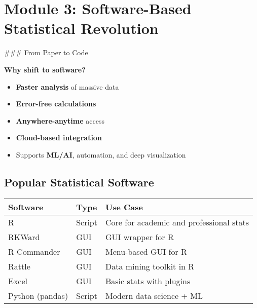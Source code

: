 \documentclass[
  letterpaper,
  DIV=11,
  numbers=noendperiod]{scrreprt}
\providecommand{\tightlist}{%
  \setlength{\itemsep}{0pt}\setlength{\parskip}{0pt}}
\begin{document}
\section{Module 3: Software-Based Statistical
Revolution}\label{module-3-software-based-statistical-revolution}

\#\#\# From Paper to Code

\textbf{Why shift to software?}

\begin{itemize}
\tightlist
\item
  \textbf{Faster analysis} of massive data
\item
  \textbf{Error-free calculations}
\item
  \textbf{Anywhere-anytime} access
\item
  \textbf{Cloud-based integration}
\item
  Supports \textbf{ML/AI}, automation, and deep visualization
\end{itemize}

\subsection{Popular Statistical
Software}\label{popular-statistical-software}

\begin{longtable}[]{@{}
  >{\raggedright\arraybackslash}p{}
  >{\raggedright\arraybackslash}p{}
  >{\raggedright\arraybackslash}p{}@{}}
\toprule\noalign{}
\begin{minipage}[b]{\linewidth}\raggedright
Software
\end{minipage} & \begin{minipage}[b]{\linewidth}\raggedright
Type
\end{minipage} & \begin{minipage}[b]{\linewidth}\raggedright
Use Case
\end{minipage} \\
\midrule\noalign{}
\endhead
\bottomrule\noalign{}
\endlastfoot
R & Script & Core for academic and professional stats \\
RKWard & GUI & GUI wrapper for R \\
R Commander & GUI & Menu-based GUI for R \\
Rattle & GUI & Data mining toolkit in R \\
Excel & GUI & Basic stats with plugins \\
Python (pandas) & Script & Modern data science + ML \\
\end{longtable}
\end{document}
